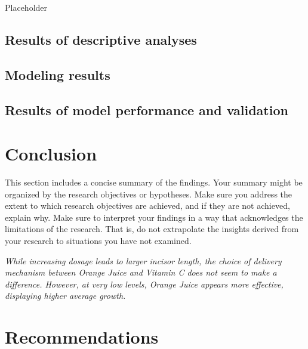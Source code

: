 \documentclass[12pt,oneside]{chicagocapstone}
\begin{document}
Placeholder

\hypertarget{findings-descriptive}{%
\section*{Results of descriptive analyses}\label{findings-descriptive}}

\hypertarget{modeling-results}{%
\section*{Modeling results}\label{modeling-results}}

\hypertarget{results-of-model-performance-and-validation}{%
\section*{Results of model performance and validation}\label{results-of-model-performance-and-validation}}

\hypertarget{conclusion}{%
\chapter*{Conclusion}\label{conclusion}}

This section includes a concise summary of the findings. Your summary might be organized by the research objectives or hypotheses. Make sure you address the extent to which research objectives are achieved, and if they are not achieved, explain why. Make sure to interpret your findings in a way that acknowledges the limitations of the research. That is, do not extrapolate the insights derived from your research to situations you have not examined.

\emph{While increasing dosage leads to larger incisor length, the choice of delivery mechanism between Orange Juice and Vitamin C does not seem to make a difference. However, at very low levels, Orange Juice appears more effective, displaying higher average growth.}

\hypertarget{recommendations}{%
\chapter*{Recommendations}\label{recommendations}}
\end{document}
